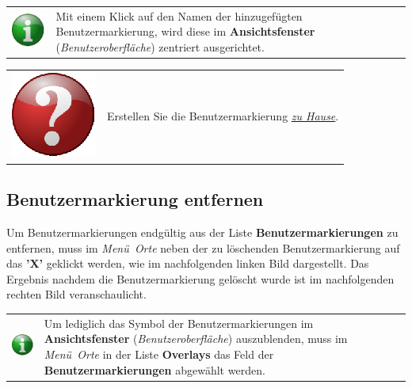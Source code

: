 \documentclass[10pt]{scrreprt}
\newcommand{\textref}[1]{\mbox{\raisebox{0.1ex}{\small$\rightarrow$ }\textit{#1}}}
\begin{document}
\vspace{3mm}
\begin{tabular}{>{\centering \arraybackslash}m{1cm} m{14cm}}
\includegraphics[scale=0.5]{images/info.eps} & Mit einem Klick auf den Namen der hinzugefügten Benutzermarkierung, wird diese im \textbf{Ansichtsfenster} (\textref{Benutzeroberfläche}) zentriert ausgerichtet.
\end{tabular}

\vspace{3mm}
\begin{tabular}{>{\centering \arraybackslash}m{1cm} m{14cm}}
\includegraphics[scale=0.5]{images/quest.eps} & Erstellen Sie die Benutzermarkierung \underline{\textit{zu Hause}}.
\end{tabular}




\vspace{5mm}
\subsection{Benutzermarkierung entfernen}  

Um Benutzermarkierungen endgültig aus der Liste \textbf{Benutzermarkierungen} zu entfernen, muss im \textref{Menü Orte} neben der zu löschenden Benutzermarkierung auf das \textbf{'X'} geklickt werden, wie im nachfolgenden linken Bild dargestellt. Das Ergebnis nachdem die Benutzermarkierung gelöscht wurde ist im nachfolgenden rechten Bild veranschaulicht.

\vspace{3mm}
\begin{tabular}{>{\centering \arraybackslash}m{1cm} m{14cm}} \index{Overlays}
\includegraphics[scale=0.5]{images/info.eps} & Um lediglich das Symbol der Benutzermarkierungen im \textbf{Ansichtsfenster} (\textref{Benutzeroberfläche}) auszublenden, muss im \textref{Menü Orte} in der Liste \textbf{Overlays} das Feld der \textbf{Benutzermarkierungen} abgewählt werden.
\end{tabular}
\end{document}
